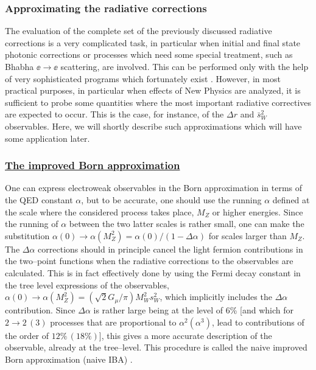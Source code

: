 \newpage

\subsubsection{Approximating the radiative corrections}

The evaluation of the complete set of the previously discussed radiative
corrections is a very complicated task, in particular when initial and final
state photonic corrections or processes which need some special treatment, such
as Bhabha $\ee \to \ee$ scattering, are involved. This can be performed only
with the help of very sophisticated programs which fortunately exist
\cite{Z-Precision}. However, in most practical purposes, in particular when
effects of New Physics are analyzed, it is sufficient to probe some
quantities where the most important radiative correctives are expected to
occur. This is the case, for instance, of the $\Delta r$ and $\bar{s}_W^2$
observables. Here, we will shortly describe such approximations which will have
some application later. 

\subsubsection*{\underline{The improved Born approximation}}

One can express electroweak observables in the Born approximation in terms of
the QED constant $\alpha$, but to be accurate, one should use the running
$\alpha$ defined at the scale where  the considered process takes place, $M_Z$
or higher energies.  Since the running of $\alpha$ between the two latter scales
is rather small, one can make the substitution $\alpha(0) \to  \alpha(M_Z^2)=
\alpha(0)/(1- \Delta  \alpha)$ for scales larger than  $M_Z$. The $\Delta
\alpha$ corrections should in principle cancel the light  fermion contributions
in the two--point functions when the  radiative corrections to the observables
are calculated. This is in fact effectively done by using the Fermi decay
constant in the tree level expressions of the observables, $\alpha(0)  \to
\alpha(M_Z^2) = (\sqrt{2} G_\mu/\pi) M_W^2 s_W^2$, which implicitly includes
the $\Delta \alpha$ contribution. Since $\Delta \alpha$ is rather large being
at the level of 6\% [and which for $ 2\to 2 \, (3)$ processes that are
proportional to $\alpha^2 (\alpha^3)$, lead to contributions of the order of
$12\%\, (18\%)$], this gives  a more accurate description of the observable,
already at the tree--level.  This procedure is called the naive improved Born
approximation (naive IBA) \cite{IBA}.\s

